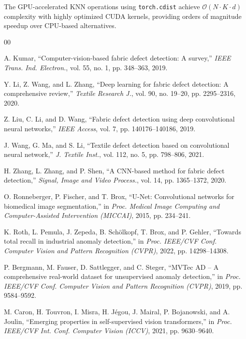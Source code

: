 \documentclass[journal]{IEEEtran}
\begin{document}
The GPU-accelerated KNN operations using \texttt{torch.cdist} achieve $\mathcal{O}(N \cdot K \cdot d)$ complexity with highly optimized CUDA kernels, providing orders of magnitude speedup over CPU-based alternatives.

\balance
\begin{thebibliography}{00}

A. Kumar, ``Computer-vision-based fabric defect detection: A survey,'' \textit{IEEE Trans. Ind. Electron.}, vol. 55, no. 1, pp. 348--363, 2019.

Y. Li, Z. Wang, and L. Zhang, ``Deep learning for fabric defect detection: A comprehensive review,'' \textit{Textile Research J.}, vol. 90, no. 19--20, pp. 2295--2316, 2020.

Z. Liu, C. Li, and D. Wang, ``Fabric defect detection using deep convolutional neural networks,'' \textit{IEEE Access}, vol. 7, pp. 140176--140186, 2019.

J. Wang, G. Ma, and S. Li, ``Textile defect detection based on convolutional neural network,'' \textit{J. Textile Inst.}, vol. 112, no. 5, pp. 798--806, 2021.

H. Zhang, L. Zhang, and P. Shen, ``A CNN-based method for fabric defect detection,'' \textit{Signal, Image and Video Process.}, vol. 14, pp. 1365--1372, 2020.

O. Ronneberger, P. Fischer, and T. Brox, ``U-Net: Convolutional networks for biomedical image segmentation,'' in \textit{Proc. Medical Image Computing and Computer-Assisted Intervention (MICCAI)}, 2015, pp. 234--241.

K. Roth, L. Pemula, J. Zepeda, B. Sch\"olkopf, T. Brox, and P. Gehler, ``Towards total recall in industrial anomaly detection,'' in \textit{Proc. IEEE/CVF Conf. Computer Vision and Pattern Recognition (CVPR)}, 2022, pp. 14298--14308.

P. Bergmann, M. Fauser, D. Sattlegger, and C. Steger, ``MVTec AD -- A comprehensive real-world dataset for unsupervised anomaly detection,'' in \textit{Proc. IEEE/CVF Conf. Computer Vision and Pattern Recognition (CVPR)}, 2019, pp. 9584--9592.

M. Caron, H. Touvron, I. Misra, H. J\'egou, J. Mairal, P. Bojanowski, and A. Joulin, ``Emerging properties in self-supervised vision transformers,'' in \textit{Proc. IEEE/CVF Int. Conf. Computer Vision (ICCV)}, 2021, pp. 9630--9640.


\end{thebibliography}
\end{document}
